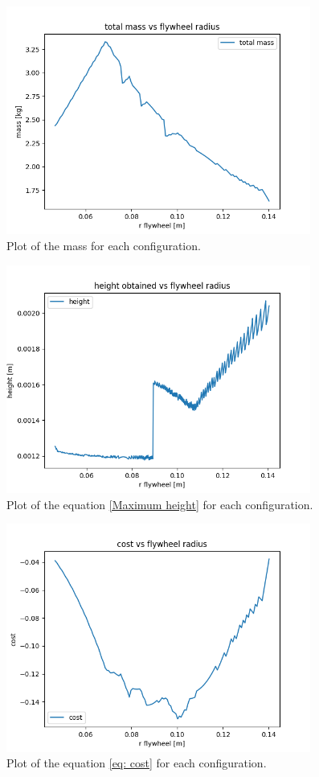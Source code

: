 \begin{figure}[H]
	\centering
	\includegraphics[width=10cm]{img/optimization/mass.png}
	\caption{Plot of the mass for each configuration.}
	\label{fig:Mass plot}
\end{figure}

\begin{figure}[H]
	\centering
	\includegraphics[width=10cm]{img/optimization/height.png}
	\caption{Plot of the equation \ref{Maximum height} for each configuration.}
	\label{fig:Mass plot}
\end{figure}

\begin{figure}[H]
	\centering
	\includegraphics[width=10cm]{img/optimization/cost.png}
	\caption{Plot of the equation \ref{eq: cost} for each configuration.}
	\label{fig:Mass plot}
\end{figure}

